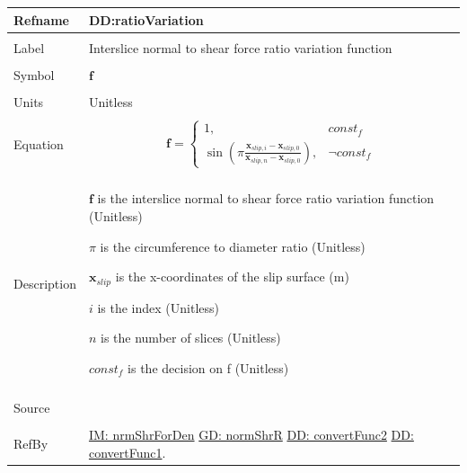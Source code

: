 \documentclass[12pt]{article}
\begin{document}
\noindent \begin{minipage}{\textwidth}
\begin{tabular}{p{} p{}}
\toprule \textbf{Refname} & \textbf{DD:ratioVariation}
\label{DD:ratioVariation}
\\ \midrule \\
Label & Interslice normal to shear force ratio variation function
\\ \midrule \\
Symbol & $\mathbf{f}$
\\ \midrule \\
Units & Unitless
\\ \midrule \\
Equation & \begin{displaymath}
           \mathbf{f}=\begin{cases}
1, & const_f\\
\sin\left(π \frac{{\mathbf{x}_{slip,i}}-{\mathbf{x}_{slip,0}}}{{\mathbf{x}_{slip,n}}-{\mathbf{x}_{slip,0}}}\right), & \neg{}const_f
\end{cases}
           \end{displaymath}
\\ \midrule \\
Description & \begin{symbDescription}
              \item{$\mathbf{f}$ is the interslice normal to shear force ratio variation function (Unitless)}
              \item{$π$ is the circumference to diameter ratio (Unitless)}
              \item{${\mathbf{x}_{slip}}$ is the x-coordinates of the slip surface (m)}
              \item{$i$ is the index (Unitless)}
              \item{$n$ is the number of slices (Unitless)}
              \item{$const_f$ is the decision on f (Unitless)}
              \end{symbDescription}
\\ \midrule \\
Source & \cite{fredlund1977}
\\ \midrule \\
RefBy & \hyperref[IM:nrmShrForDen]{IM: nrmShrForDen} \hyperref[GD:normShrR]{GD: normShrR} \hyperref[DD:convertFunc2]{DD: convertFunc2} \hyperref[DD:convertFunc1]{DD: convertFunc1}.
\\ \bottomrule \end{tabular}
\end{minipage}
\par~
\end{document}
